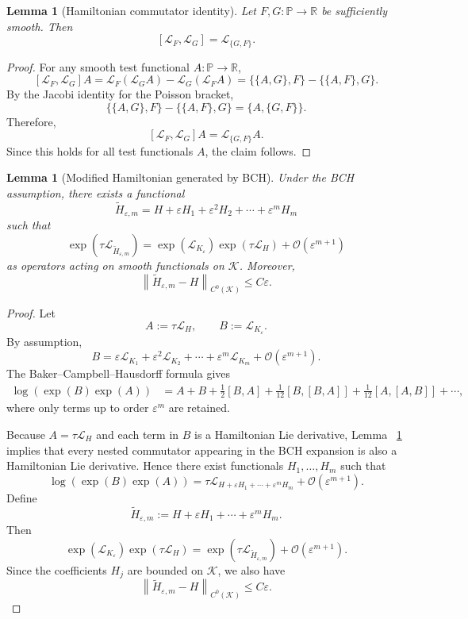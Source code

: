 \documentclass{article}
\theoremstyle{plain}
\newtheorem{lemma}[theorem]{Lemma}
\theoremstyle{definition}
\theoremstyle{remark}
\newcommand{\bbR}{\mathbb{R}}
\newcommand{\bbP}{\mathbb{P}}
\newcommand{\norm}[1]{\left\lVert #1\right\rVert}
\begin{document}
\begin{lemma}[Hamiltonian commutator identity]\label{lem1}
Let \(F,G:\bbP\to\bbR\) be sufficiently smooth. Then
\[
    [\mathcal{L}_F,\mathcal{L}_G]
    =\mathcal{L}_{\{G,F\}}.
\]
\end{lemma}

\begin{proof}
For any smooth test functional \(A:\bbP\to\bbR\),
\[
    [\mathcal{L}_F,\mathcal{L}_G]A
    =\mathcal{L}_F(\mathcal{L}_G A)-\mathcal{L}_G(\mathcal{L}_F A)
    =\{\{A,G\},F\}-\{\{A,F\},G\}.
\]
By the Jacobi identity for the Poisson bracket,
\[
    \{\{A,G\},F\}-\{\{A,F\},G\}
    =\{A,\{G,F\}\}.
\]
Therefore,
\[
    [\mathcal{L}_F,\mathcal{L}_G]A
    =\mathcal{L}_{\{G,F\}}A.
\]
Since this holds for all test functionals \(A\), the claim follows.
\end{proof}

\begin{lemma}[Modified Hamiltonian generated by BCH]\label{lem2}
Under the BCH assumption, there exists a functional
\[
    \widetilde H_{\varepsilon,m}
    =H+\varepsilon H_1+\varepsilon^2H_2+\cdots+\varepsilon^mH_m
\]
such that
\[
    \exp(\tau\mathcal{L}_{\widetilde H_{\varepsilon,m}})
    =
    \exp(\mathcal{L}_{K_\varepsilon})\exp(\tau\mathcal{L}_H)
    +\mathcal{O}(\varepsilon^{m+1})
\]
as operators acting on smooth functionals on \(\mathcal{K}\). Moreover,
\[
    \norm{\widetilde H_{\varepsilon,m}-H}_{C^0(\mathcal{K})}
    \leq C\varepsilon.
\]
\end{lemma}

\begin{proof}
Let
\[
    A:=\tau\mathcal{L}_H,
    \qquad
    B:=\mathcal{L}_{K_\varepsilon}.
\]
By assumption,
\[
    B=\varepsilon\mathcal{L}_{K_1}+\varepsilon^2\mathcal{L}_{K_2}+\cdots+\varepsilon^m\mathcal{L}_{K_m}+\mathcal{O}(\varepsilon^{m+1}).
\]
The Baker--Campbell--Hausdorff formula gives
\[
\begin{aligned}
    \log(\exp(B)\exp(A))
    &=A+B+\frac12[B,A]
      +\frac{1}{12}[B,[B,A]]
      +\frac{1}{12}[A,[A,B]]
      +\cdots,
\end{aligned}
\]
where only terms up to order \(\varepsilon^m\) are retained.

Because \(A=\tau\mathcal{L}_H\) and each term in \(B\) is a Hamiltonian Lie derivative, Lemma ~\ref{lem1} implies that every nested commutator appearing in the BCH expansion is also a Hamiltonian Lie derivative. Hence there exist functionals \(H_1,\ldots,H_m\) such that
\[
    \log(\exp(B)\exp(A))
    =\tau\mathcal{L}_{H+\varepsilon H_1+\cdots+\varepsilon^mH_m}
     +\mathcal{O}(\varepsilon^{m+1}).
\]
Define
\[
    \widetilde H_{\varepsilon,m}:=H+\varepsilon H_1+\cdots+\varepsilon^mH_m.
\]
Then
\[
    \exp(\mathcal{L}_{K_\varepsilon})\exp(\tau\mathcal{L}_H)
    =\exp(\tau\mathcal{L}_{\widetilde H_{\varepsilon,m}})
     +\mathcal{O}(\varepsilon^{m+1}).
\]
Since the coefficients \(H_j\) are bounded on \(\mathcal{K}\), we also have
\[
    \norm{\widetilde H_{\varepsilon,m}-H}_{C^0(\mathcal{K})}
    \leq C\varepsilon.
\]
\end{proof}
\end{document}

